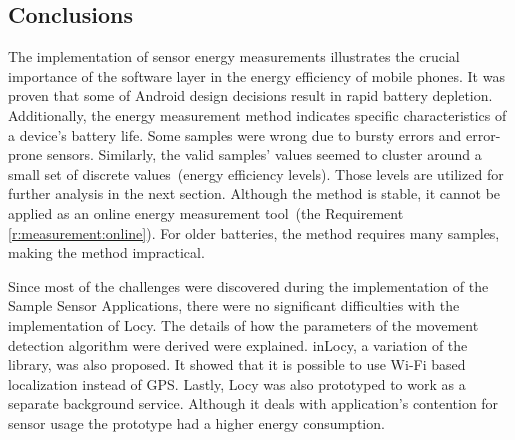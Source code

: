 \subsection{Conclusions}
\hspace{10pt} The implementation of sensor energy measurements illustrates the crucial importance of the software layer in the energy efficiency of mobile phones. It was proven that some of Android design decisions result in rapid battery depletion. Additionally, the energy measurement method indicates specific characteristics of a device's battery life. Some samples were wrong due to bursty errors and error-prone sensors. Similarly, the valid samples' values seemed to cluster around a small set of discrete values\ (energy efficiency levels). Those levels are utilized for further analysis in the next section. Although the method is stable, it cannot be applied as an online energy measurement tool\ (the Requirement \ref{r:measurement:online}). For older batteries, the method requires many samples, making the method impractical.

Since most of the challenges were discovered during the implementation of the Sample Sensor Applications, there were no significant difficulties with the implementation of Locy. The details of how the parameters of the movement detection algorithm were derived were explained. inLocy, a variation of the library, was also proposed. It showed that it is possible to use Wi-Fi based localization instead of GPS. Lastly, Locy was also prototyped to work as a separate background service. Although it deals with application's contention for sensor usage the prototype had a higher energy consumption. 
